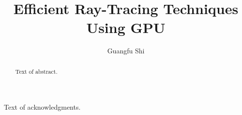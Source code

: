 \documentclass[12pt]{report}
\author{Guangfu Shi}
\title{Efficient Ray-Tracing Techniques Using GPU}
\begin{document}
\begin{abstract}
  Text of abstract.  
\end{abstract}

\begin{acknowledgments}
  Text of acknowledgments.
\end{acknowledgments}


\setcounter{page}{1}







%








\end{document}
